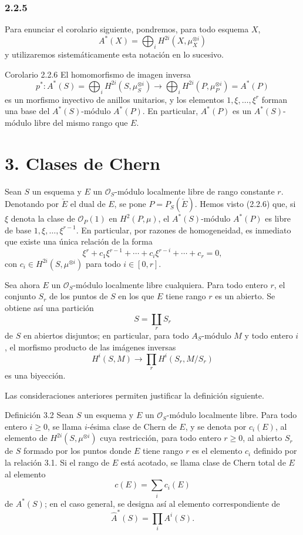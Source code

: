 \subsubsection*{2.2.5}
Para enunciar el corolario siguiente, pondremos, para todo esquema $X$,
\[
A^*(X)=\bigoplus_i H^{2i}(X,\mu_X^{\otimes i})
\]
y utilizaremos sistemáticamente esta notación en lo sucesivo.

\begin{statement}{Corolario 2.2.6}
El homomorfismo de imagen inversa
\[
p^*:A^*(S)=\bigoplus_i H^{2i}(S,\mu_S^{\otimes i})
\longrightarrow
\bigoplus_i H^{2i}(P,\mu_P^{\otimes i})=A^*(P)
\]
es un morfismo inyectivo de anillos unitarios, y los elementos $1,\xi,\ldots,\xi^r$ forman una base del $A^*(S)$-módulo $A^*(P)$. En particular, $A^*(P)$ es un $A^*(S)$-módulo libre del mismo rango que $E$.
\end{statement}

\section*{3. Clases de Chern}

Sean $S$ un esquema y $E$ un $\mathcal O_S$-módulo localmente libre de rango constante $r$. Denotando por $\check E$ el dual de $E$, se pone $P=P_S(\check E)$. Hemos visto (2.2.6) que, si $\xi$ denota la clase de $\mathcal O_P(1)$ en $H^2(P,\mu)$, el $A^*(S)$-módulo $A^*(P)$ es libre de base $1,\xi,\ldots,\xi^{r-1}$. En particular, por razones de homogeneidad, es inmediato que existe una única relación de la forma
\[
\xi^r+c_1\xi^{r-1}+\cdots+c_i\xi^{r-i}+\cdots+c_r=0,
\tag{3.1}
\]
con $c_i\in H^{2i}(S,\mu^{\otimes i})$ para todo $i\in[0,r]$.

Sea ahora $E$ un $\mathcal O_S$-módulo localmente libre cualquiera. Para todo entero $r$, el conjunto $S_r$ de los puntos de $S$ en los que $E$ tiene rango $r$ es un abierto. Se obtiene así una partición
\[
S=\coprod_r S_r
\]
de $S$ en abiertos disjuntos; en particular, para todo $A_S$-módulo $M$ y todo entero $i$, el morfismo producto de las imágenes inversas
\[
H^i(S,M)\longrightarrow \prod_r H^i(S_r,M/S_r)
\]
es una biyección.

Las consideraciones anteriores permiten justificar la definición siguiente.

\begin{statement}{Definición 3.2}
Sean $S$ un esquema y $E$ un $\mathcal O_S$-módulo localmente libre. Para todo entero $i\ge0$, se llama $i$-ésima clase de Chern de $E$, y se denota por $c_i(E)$, al elemento de $H^{2i}(S,\mu^{\otimes i})$ cuya restricción, para todo entero $r\ge0$, al abierto $S_r$ de $S$ formado por los puntos donde $E$ tiene rango $r$ es el elemento $c_i$ definido por la relación 3.1. Si el rango de $E$ está acotado, se llama clase de Chern total de $E$ al elemento
\[
c(E)=\sum_i c_i(E)
\]
de $A^*(S)$; en el caso general, se designa así al elemento correspondiente de
\[
\widehat A^*(S)=\prod_i A^i(S).
\]
\end{statement}
